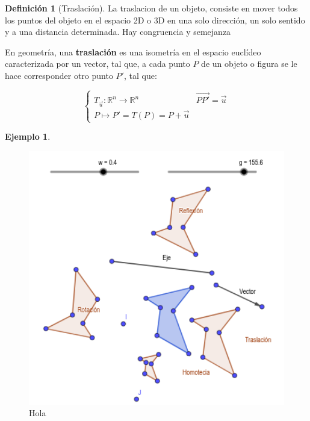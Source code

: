 \documentclass[16pt,]{krantz}
\theoremstyle{definition}
\newtheorem{definition}{Definición}[chapter]
\theoremstyle{definition}
\newtheorem{example}{Ejemplo}[chapter]
\theoremstyle{definition}
\theoremstyle{definition}
\theoremstyle{remark}
\begin{document}
\begin{definition}[Traslación]
\protect\hypertarget{def:traslacion}{}{\label{def:traslacion} {} }La traslacion de un objeto, consiste en mover todos los puntos del objeto en el espacio 2D o 3D en una solo dirección, un solo sentido y a una distancia determinada. Hay congruencia y semejanza
\end{definition}

En geometría, una \textbf{traslación} es una isometría en el espacio euclídeo caracterizada por un vector, tal que, a cada punto \(P\) de un objeto o figura se le hace corresponder otro punto \(P'\), tal que:

\[
\begin{cases}T_{\vec {u}}:\mathbb {R} ^{n}\to \mathbb {R} ^{n}&{\overrightarrow {PP'}}={\vec {u}}\\P\mapsto P'=T(P)=P+{\vec {u}}\end{cases}
\]

\begin{example}
\protect\hypertarget{exm:unnamed-chunk-3}{}{\label{exm:unnamed-chunk-3} }
\end{example}

\begin{figure}

{\centering \includegraphics[width=5.44in]{trasformacion} 

}

\caption{Hola}\label{fig:Dogewwwwww}
\end{figure}
\end{document}

